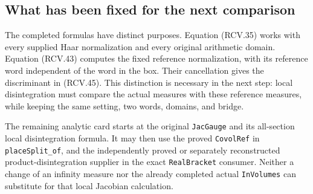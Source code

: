 \subsection{What has been fixed for the next comparison}

The completed formulas have distinct purposes.  Equation (RCV.35)
works with every supplied Haar normalization and every original
arithmetic domain.  Equation (RCV.43) computes the fixed reference
normalization, with its reference word independent of the word in
the box.  Their cancellation gives the discriminant in (RCV.45).
This distinction is necessary in the next step: local disintegration
must compare the actual measures with these reference measures,
while keeping the same setting, two words, domains, and bridge.

The remaining analytic card starts at the original
\texttt{JacGauge} and its all-section local disintegration formula.
It may then use the proved \texttt{CovolRef} in
\texttt{placeSplit\_of}, and the independently proved or separately
reconstructed product-disintegration supplier in the exact
\texttt{RealBracket} consumer.  Neither a change of an infinity
measure nor the already completed actual \texttt{InVolumes}
can substitute for that local Jacobian calculation.
